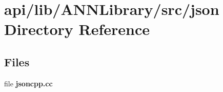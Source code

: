 \section{api/lib/\+A\+N\+N\+Library/src/json Directory Reference}
\label{dir_089a6661009f2594dce54d3fa0b55299}
\subsection*{Files}
\begin{DoxyCompactItemize}
\item 
file {\bfseries jsoncpp.\+cc}
\end{DoxyCompactItemize}
